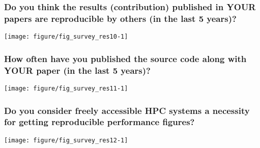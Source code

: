 \documentclass{article}\usepackage[]{graphicx}\usepackage[]{color}
\newenvironment{knitrout}{}{}
\begin{document}
\subsubsection{Do you think the results (contribution) published in YOUR papers are reproducible by others (in the last 5 years)?}

\begin{knitrout}
\color{fgcolor}

{\centering \texttt{[image: figure/fig\_survey\_res10-1]} 

}



\end{knitrout}





\subsubsection{How often have you published the source code along with YOUR paper (in the last 5 years)?}

\begin{knitrout}
\color{fgcolor}

{\centering \texttt{[image: figure/fig\_survey\_res11-1]} 

}



\end{knitrout}





\subsubsection{Do you consider freely accessible HPC systems a necessity for getting reproducible performance figures?}

\begin{knitrout}
\color{fgcolor}

{\centering \texttt{[image: figure/fig\_survey\_res12-1]} 

}



\end{knitrout}
\end{document}
